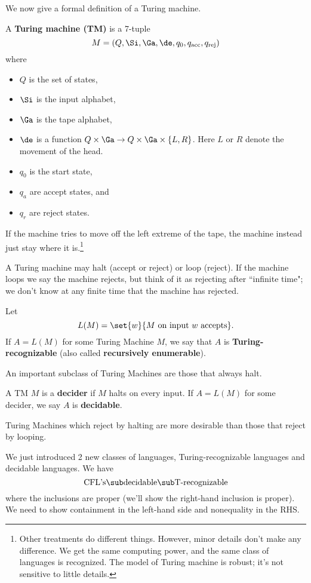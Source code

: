 We now give a formal definition of a Turing machine. %
\begin{df}
A \textbf{Turing machine (TM)} is a 7-tuple 
\[
M=(Q,\Si,\Ga,\de,q_0,q_{\text{acc}},q_{\text{rej}})
\]
where
\begin{itemize}
\item
$Q$ is the set of states,
\item
$\Si$ is the input alphabet,
\item
$\Ga$ is the tape alphabet,
\item
$\de$ is a function $Q\times \Ga\to Q\times \Ga\times \{L,R\}$. Here $L$ or $R$ denote the movement of the head.
\item
$q_0$ is the start state,
\item
$q_a$ are accept states, and
\item
$q_r$ are reject states.
\end{itemize}
If the machine tries to move off the left extreme of the tape,  the machine instead just stay where it is.\footnote{Other treatments do different things. However, minor details don't make any difference. We get the same computing power, and the same class of languages is recognized. %
The model of Turing machine is robust; it's not sensitive to little details.}
\end{df}
A Turing machine may halt (accept or reject) or loop (reject). If the machine loops we say the machine rejects, but think of it as rejecting after ``infinite time"; we don't know at any finite time that the machine has rejected.
\begin{df}
Let
\[
L(M)=\set{w}{M\text{ on input }w\text{ accepts}}.
\]
If $A=L(M)$ for some Turing Machine $M$, we say that $A$ is \textbf{Turing-recognizable} (also called \textbf{recursively enumerable}).
\end{df}
An important subclass of Turing Machines are those that always halt.
\begin{df}
A TM $M$ is a \textbf{decider} if $M$ halts on every input. If $A=L(M)$ for some decider, we say $A$ is \textbf{decidable}.
\end{df}

Turing Machines which reject by halting are more desirable than those that reject by looping.

We just introduced 2 new classes of languages, Turing-recognizable languages and decidable languages. We have
\[
\text{CFL's}\sub\text{decidable}\sub\text{T-recognizable}
\]
where the inclusions are proper (we'll show the right-hand inclusion is proper). We need to show containment in the left-hand side and nonequality in the RHS.

